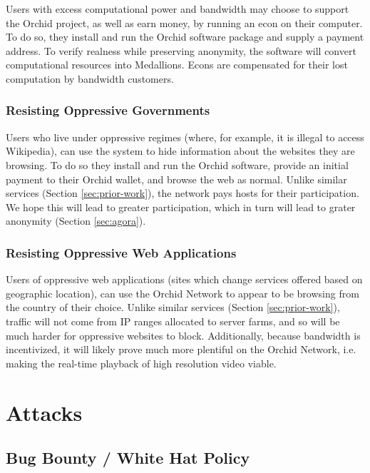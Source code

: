 \documentclass{article}
\newcommand{\mesh}{Orchid}
\begin{document}
Users with excess computational power and bandwidth may choose to support the \mesh{} project, as well as earn money, by running an econ on their computer. To do so, they install and run the \mesh{} software package and supply a payment address. To verify realness while preserving anonymity, the software will convert computational resources into Medallions. Econs are compensated for their lost computation by bandwidth customers.

\subsubsection{Resisting Oppressive Governments}

Users who live under oppressive regimes (where, for example, it is illegal to access Wikipedia), can use the system to hide information about the websites they are browsing. To do so they install and run the \mesh{} software, provide an initial payment to their \mesh{} wallet, and browse the web as normal. Unlike similar services (Section \ref{sec:prior-work}), the network pays hosts for their participation. We hope this will lead to greater participation, which in turn will lead to grater anonymity (Section \ref{sec:agora}).

\subsubsection{Resisting Oppressive Web Applications}

Users of oppressive web applications (sites which change services offered based on geographic location), can use the \mesh{} Network to appear to be browsing from the country of their choice. Unlike similar services (Section \ref{sec:prior-work}), traffic will not come from IP ranges allocated to server farms, and so will be much harder for oppressive websites to block. Additionally, because bandwidth is incentivized, it will likely prove much more plentiful on the \mesh{} Network, i.e. making the real-time playback of high resolution video viable.


\section{Attacks}
\label{sec:attacks}

\subsection{Bug Bounty / White Hat Policy}
\end{document}
